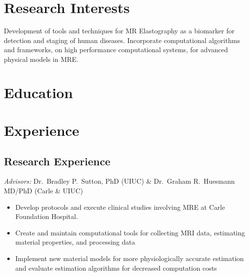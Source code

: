 \documentclass[11pt,letterpaper,sans]{moderncv}
\begin{document}

\maketitle

\section{Research Interests}

Development of tools and techniques for MR Elastography as a biomarker for detection and staging of human diseases.
Incorporate computational algorithms and frameworks, on high performance computational systems, for advanced physical models in MRE.

\section{Education}





\section{Experience}

\subsection{Research Experience}

%
  {\textit{Advisors:} Dr.\ Bradley P.\ Sutton, PhD (UIUC) \& Dr.\ Graham R.\ Huesmann MD/PhD (Carle \& UIUC)
  \begin{itemize}
	\item Develop protocols and execute clinical studies involving MRE at Carle Foundation Hospital.
  	\item Create and maintain computational tools for collecting MRI data, estimating material properties, and processing data
	\item Implement new material models for more physiologically accurate estimation and evaluate estimation algorithms for decreased computation costs
  \end{itemize}
  }
\end{document}
